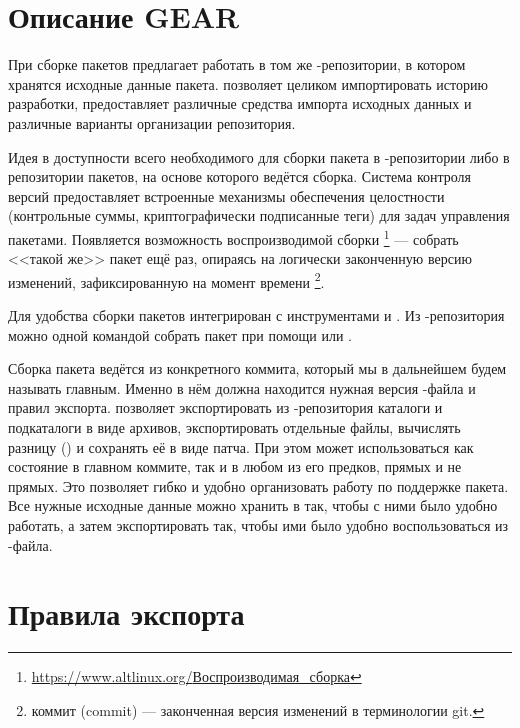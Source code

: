\section{Описание GEAR}
При сборке пакетов  предлагает работать в том же -репозитории,
в котором хранятся исходные данные пакета.  позволяет целиком импортировать
историю разработки, предоставляет различные средства импорта исходных данных и
различные варианты организации репозитория.

Идея  в доступности всего необходимого для сборки пакета в -репозитории
либо в репозитории пакетов, на основе которого ведётся сборка. Система контроля версий
 предоставляет встроенные механизмы обеспечения целостности (контрольные суммы,
криптографически подписанные теги) для задач управления пакетами. Появляется возможность
воспроизводимой сборки%
\footnote{\href{https://www.altlinux.org/\%D0\%92\%D0\%BE\%D1\%81\%D0\%BF\%D1\%80\%D0\%BE\%D0\%B8\%D0\%B7\%D0\%B2\%D0\%BE\%D0\%B4\%D0\%B8\%D0\%BC\%D0\%B0\%D1\%8F\_\%D1\%81\%D0\%B1\%D0\%BE\%D1\%80\%D0\%BA\%D0\%B0}
{\url{https://www.altlinux.org/}Воспроизводимая\_сборка}} --- собрать <<такой же>> пакет ещё раз, опираясь на логически
законченную версию изменений, зафиксированную на момент времени%
\footnote{коммит (commit) --- законченная версия изменений в терминологии git.}.

Для удобства сборки пакетов  интегрирован с инструментами  и
. Из -репозитория можно одной командой собрать пакет при помощи
 или .

Сборка пакета ведётся из конкретного коммита, который мы в дальнейшем будем называть главным.
Именно в нём должна находится нужная версия -файла и правил экспорта. 
позволяет экспортировать из -репозитория каталоги и подкаталоги в виде архивов,
экспортировать отдельные файлы, вычислять разницу () и сохранять её в виде патча.
При этом может использоваться как состояние в главном коммите, так и в любом из его предков,
прямых и не прямых. Это позволяет гибко и удобно организовать работу по поддержке пакета.
Все нужные исходные данные можно хранить в  так, чтобы с ними было удобно работать,
а затем экспортировать так, чтобы ими было удобно воспользоваться из -файла.

\section{Правила экспорта}

